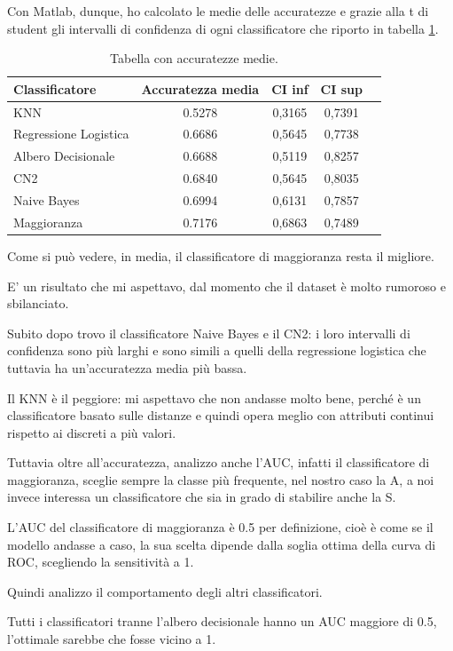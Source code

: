 \documentclass[a4paper, 12p]{report}
\begin{document}
Con Matlab, dunque,  ho calcolato le medie delle accuratezze e grazie alla t di student gli intervalli di confidenza di ogni classificatore che riporto in tabella \ref{tab:1}.
\begin{table}
\centering
\caption{Tabella con accuratezze medie.}
\label{tab:1}
\begin{tabular}{|l|c|c|c|l|}
\hline
Classificatore & Accuratezza media & CI inf  & CI sup\\
\hline
KNN & 0.5278 & 0,3165 & 0,7391\\
\hline
Regressione Logistica & 0.6686 & 0,5645 & 0,7738\\
\hline
Albero Decisionale & 0.6688 & 0,5119 & 0,8257\\
\hline
CN2 & 0.6840 & 0,5645 & 0,8035\\
\hline
Naive Bayes & 0.6994 & 0,6131 & 0,7857\\
\hline
Maggioranza & 0.7176 & 0,6863 & 0,7489\\
\hline

\end{tabular}
\end{table}

Come si può vedere, in media, il classificatore di maggioranza resta il migliore.

E' un risultato che mi aspettavo, dal momento che il dataset è molto rumoroso e sbilanciato. 

Subito dopo trovo il classificatore Naive Bayes e il CN2: i loro intervalli di confidenza sono più larghi e sono simili a quelli della regressione logistica che tuttavia ha un'accuratezza media più bassa.

 Il KNN è il peggiore: mi aspettavo che non andasse molto bene, perché è un classificatore basato sulle distanze e quindi opera meglio con attributi continui rispetto ai discreti a più valori.

Tuttavia oltre all'accuratezza, analizzo anche l'AUC, infatti il classificatore di maggioranza, sceglie sempre la classe più frequente, nel nostro caso la A, a noi invece interessa un classificatore che sia in grado di stabilire anche la S. 

L'AUC del classificatore di maggioranza è 0.5 per definizione, cioè è come se il modello andasse a caso, la sua scelta dipende dalla soglia ottima della curva di ROC, scegliendo la sensitività a 1.

\noindent Quindi analizzo il comportamento degli altri classificatori.

Tutti i classificatori tranne l'albero decisionale hanno un AUC maggiore di 0.5, l'ottimale sarebbe che fosse vicino a 1. 
\end{document}
